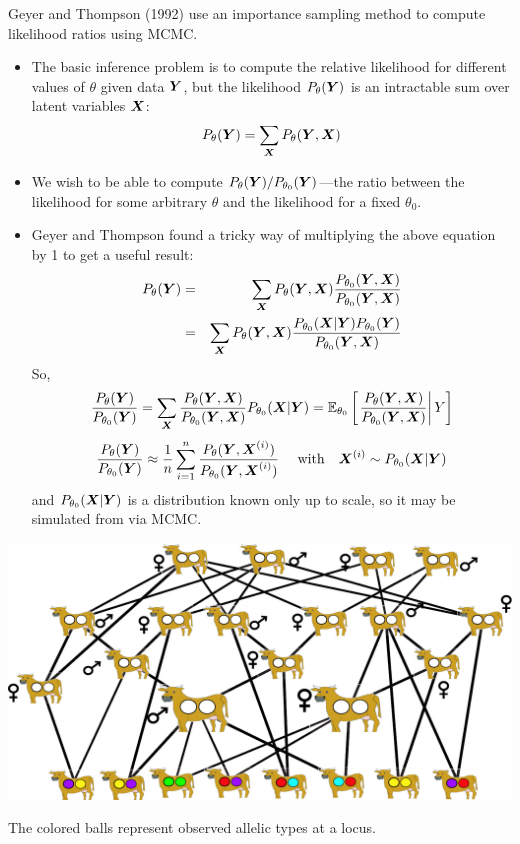 Geyer and Thompson (1992) use an importance sampling method to compute likelihood ratios using MCMC.  
\begin{itemize}
\item The basic inference problem is to compute the relative likelihood for different values of $\theta$ given data $\bY$, but the likelihood $P_\theta(\bY)$ is an intractable sum over latent variables $\bX$:
\[
	P_\theta(\bY) = \sum_{\bX} P_\theta(\bY,\bX)
\]
\item We wish to be able to compute $P_\theta(\bY) / P_{\theta_{0}}(\bY)$---the ratio between the likelihood for some arbitrary $\theta$ and the likelihood for a fixed $\theta_0$.
\item Geyer and Thompson found a tricky way of multiplying the above equation by 1 to get a useful result:
\newpage
\addtolength{\jot}{2ex}
\begin{eqnarray*}
P_\theta(\bY) & = &\sum_{\bX} P_\theta(\bY,\bX)\frac{P_{\theta_0}(\bY,\bX)}{P_{\theta_0}(\bY,\bX)} \\
& = &\sum_{\bX} P_\theta(\bY,\bX)\frac{P_{\theta_0}(\bX|\bY)P_{\theta_0}(\bY)}{P_{\theta_0}(\bY,\bX)} \\
\end{eqnarray*}   
So,
\[
	\frac{P_\theta(\bY)}{P_{\theta_0}(\bY)} = \sum_{\bX} \frac{P_\theta(\bY,\bX)}{P_{\theta_0}(\bY,\bX)}
	P_{\theta_0}(\bX|\bY) = 
	\Exp_{\theta_0}\left[\left. \frac{P_\theta(\bY,\bX)}{P_{\theta_0}(\bY,\bX)}  \right| Y \right]
\]
\[
	\frac{P_\theta(\bY)}{P_{\theta_0}(\bY)} \approx \frac{1}{n}\sum_{i=1}^n
	 \frac{P_\theta(\bY,\bX^{(i)})}{P_{\theta_0}(\bY,\bX^{(i)})}~~~~\mathrm{with}~~~
	 \bX^{(i)} \sim P_{\theta_0}(\bX|\bY)
\]
and $P_{\theta_0}(\bX|\bY)$ is a distribution known only up to scale, so it may be simulated from via MCMC.
\end{itemize}


\begin{center}
\includegraphics[width=.95\textwidth]{illus/cows_dat.pdf}
\end{center}
The colored balls represent observed allelic types at a locus.

